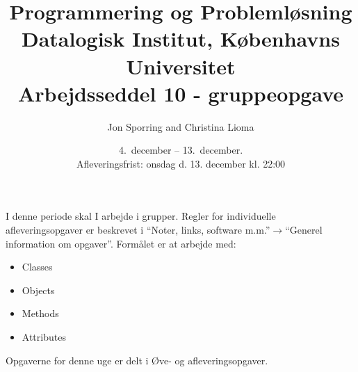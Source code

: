 \documentclass[a4paper,12pt]{article}
\title{Programmering og Problemløsning\\Datalogisk Institut,
  Københavns Universitet\\Arbejdsseddel 10 - gruppeopgave}
\author{Jon Sporring and Christina Lioma}
\date{4.\ december -- 13.\ december.\\Afleveringsfrist: onsdag d. 13. december kl. 22:00}
\begin{document}
\maketitle

I denne periode skal I arbejde i grupper. Regler for individuelle afleveringsopgaver er beskrevet i "`Noter, links, software m.m."'$\rightarrow$"`Generel information om opgaver"'. Formålet er at arbejde med:
\begin{itemize}
\item Classes
\item Objects
\item Methods
\item Attributes
\end{itemize}

Opgaverne for denne uge er delt i Øve- og afleveringsopgaver. 
\end{document}
